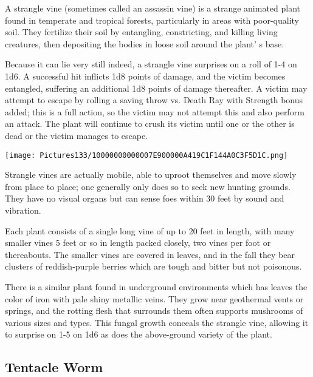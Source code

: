 \documentclass[a4paper,twoside,openany,10pt]{book}
\begin{document}
\begin{multicols}{2}
A strangle vine (sometimes called an assassin vine) is a strange animated plant found in temperate and tropical forests, particularly in areas with poor-quality soil. They fertilize their soil by entangling, constricting, and killing living creatures, then depositing the bodies in loose soil around the plant' s base.

Because it can lie very still indeed, a strangle vine surprises on a roll of 1-4 on 1d6. A successful hit inflicts 1d8 points of damage, and the victim becomes entangled, suffering an additional 1d8 points of damage thereafter. A victim may attempt to escape by rolling a saving throw vs. Death Ray with Strength bonus added; this is a full action, so the victim may not attempt this and also perform an attack. The plant will continue to crush its victim until one or the other is dead or the victim manages to escape.


\begin{center} \texttt{[image: Pictures133/10000000000007E900000A419C1F144A0C3F5D1C.png]} \end{center}

Strangle vines are actually mobile, able to uproot themselves and move slowly from place to place; one generally only does so to seek new hunting grounds. They have no visual organs but can sense foes within 30 feet by sound and vibration.

Each plant consists of a single long vine of up to 20 feet in length, with many smaller vines 5 feet or so in length packed closely, two vines per foot or thereabouts. The smaller vines are covered in leaves, and in the fall they bear clusters of reddish-purple berries which are tough and bitter but not poisonous.

There is a similar plant found in underground environments which has leaves the color of iron with pale shiny metallic veins. They grow near geothermal vents or springs, and the rotting flesh that surrounds them often supports mushrooms of various sizes and types. This fungal growth conceals the strangle vine, allowing it to surprise on 1-5 on 1d6 as does the above-ground variety of the plant.

\subsection*{Tentacle Worm}\label{tentacle-worm}


\end{multicols}
\end{document}
